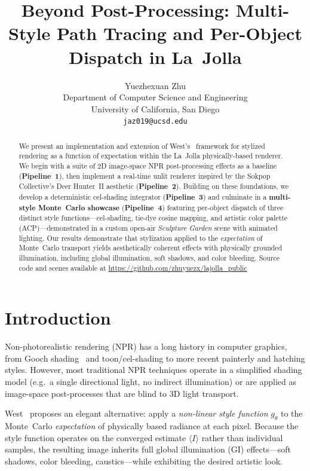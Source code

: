 \documentclass{article}
\title{Beyond Post-Processing: Multi-Style Path Tracing and Per-Object Dispatch in La~Jolla}
\author{%
  Yuezhexuan Zhu \\
  Department of Computer Science and Engineering\\
  University of California, San Diego\\
  \texttt{jaz019@ucsd.edu} \\
}
\begin{document}
\maketitle

\begin{abstract}
We present an implementation and extension of West's~\cite{west2024stylized} framework for stylized rendering as a function of expectation within the La~Jolla physically-based renderer. We begin with a suite of 2D image-space NPR post-processing effects as a baseline (\textbf{Pipeline~1}), then implement a real-time unlit renderer inspired by the Sokpop Collective's Deer Hunter~II aesthetic (\textbf{Pipeline~2}). Building on these foundations, we develop a deterministic cel-shading integrator (\textbf{Pipeline~3}) and culminate in a \textbf{multi-style Monte~Carlo showcase} (\textbf{Pipeline~4}) featuring per-object dispatch of three distinct style functions---cel-shading, tie-dye cosine mapping, and artistic color palette (ACP)---demonstrated in a custom open-air \emph{Sculpture Garden} scene with animated lighting. Our results demonstrate that stylization applied to the \emph{expectation} of Monte~Carlo transport yields aesthetically coherent effects with physically grounded illumination, including global illumination, soft shadows, and color bleeding. Source code and scenes available at \url{https://github.com/zhuyuezx/lajolla_public}
\end{abstract}


\section{Introduction}
\label{sec:intro}

Non-photorealistic rendering (NPR) has a long history in computer graphics, from Gooch shading~\cite{gooch1998non} and toon/cel-shading to more recent painterly and hatching styles. However, most traditional NPR techniques operate in a simplified shading model (e.g.\ a single directional light, no indirect illumination) or are applied as image-space post-processes that are blind to 3D light transport.

West~\cite{west2024stylized} proposes an elegant alternative: apply a \emph{non-linear style function} $g_\theta$ to the Monte~Carlo \emph{expectation} of physically based radiance at each pixel. Because the style function operates on the converged estimate $\langle I \rangle$ rather than individual samples, the resulting image inherits full global illumination (GI) effects—soft shadows, color bleeding, caustics—while exhibiting the desired artistic look.
\end{document}
